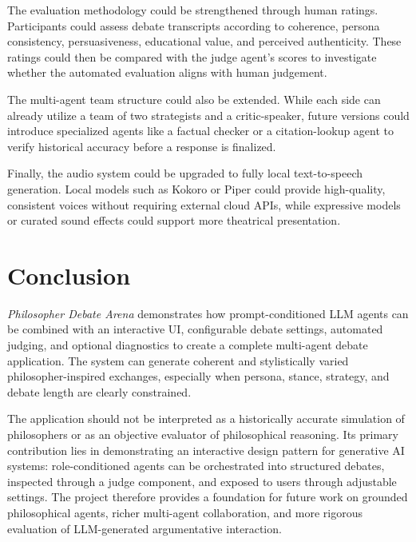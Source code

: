 \documentclass[11pt,a4paper]{article}
\begin{document}
The evaluation methodology could be strengthened through human ratings. Participants could assess debate transcripts according to coherence, persona consistency, persuasiveness, educational value, and perceived authenticity. These ratings could then be compared with the judge agent's scores to investigate whether the automated evaluation aligns with human judgement.

The multi-agent team structure could also be extended. While each side can already utilize a team of two strategists and a critic-speaker, future versions could introduce specialized agents like a factual checker or a citation-lookup agent to verify historical accuracy before a response is finalized.

Finally, the audio system could be upgraded to fully local text-to-speech generation. Local models such as Kokoro or Piper could provide high-quality, consistent voices without requiring external cloud APIs, while expressive models or curated sound effects could support more theatrical presentation.

\section{Conclusion}

\emph{Philosopher Debate Arena} demonstrates how prompt-conditioned LLM agents can be combined with an interactive UI, configurable debate settings, automated judging, and optional diagnostics to create a complete multi-agent debate application. The system can generate coherent and stylistically varied philosopher-inspired exchanges, especially when persona, stance, strategy, and debate length are clearly constrained.

The application should not be interpreted as a historically accurate simulation of philosophers or as an objective evaluator of philosophical reasoning. Its primary contribution lies in demonstrating an interactive design pattern for generative AI systems: role-conditioned agents can be orchestrated into structured debates, inspected through a judge component, and exposed to users through adjustable settings. The project therefore provides a foundation for future work on grounded philosophical agents, richer multi-agent collaboration, and more rigorous evaluation of LLM-generated argumentative interaction.
\end{document}
